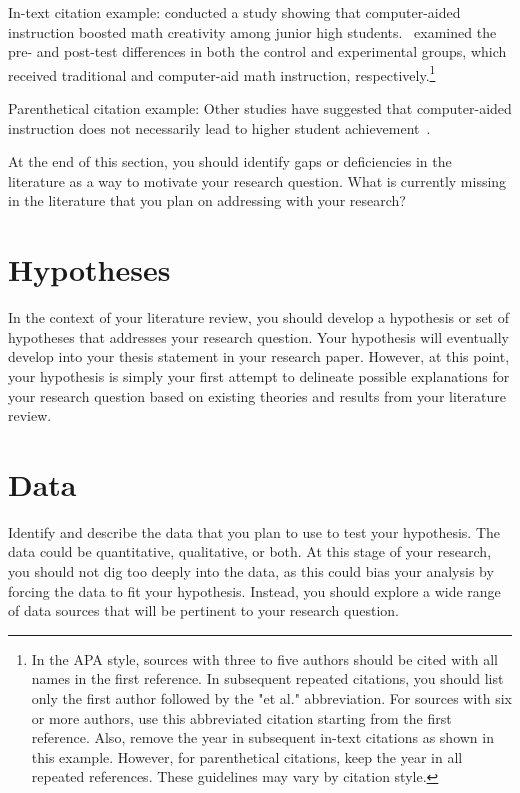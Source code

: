 In-text citation example: \citet*{Aqda11} conducted a study showing that computer-aided instruction boosted math creativity among junior high students.~\citeauthor{Aqda11} examined the pre- and post-test differences in both the control and experimental groups, which received traditional and computer-aid math instruction, respectively.\footnote{In the APA style, sources with three to five authors should be cited with all names in the first reference. In subsequent repeated citations, you should list only the first author followed by the "et al." abbreviation. For sources with six or more authors, use this abbreviated citation starting from the first reference. Also, remove the year in subsequent in-text citations as shown in this example. However, for parenthetical citations, keep the year in all repeated references. These guidelines may vary by citation style.}

Parenthetical citation example: Other studies have suggested that computer-aided instruction does not necessarily lead to higher student achievement~\citep{Angrist02, Ross99}.

At the end of this section, you should identify gaps or deficiencies in the literature as a way to motivate your research question. What is currently missing in the literature that you plan on addressing with your research?


\section{Hypotheses}

In the context of your literature review, you should develop a hypothesis or set of hypotheses that addresses your research question. Your hypothesis will eventually develop into your thesis statement in your research paper. However, at this point, your hypothesis is simply your first attempt to delineate possible explanations for your research question based on existing theories and results from your literature review.


\section{Data}

Identify and describe the data that you plan to use to test your hypothesis. The data could be quantitative, qualitative, or both. At this stage of your research, you should not dig too deeply into the data, as this could bias your analysis by forcing the data to fit your hypothesis. Instead, you should explore a wide range of data sources that will be pertinent to your research question. 

